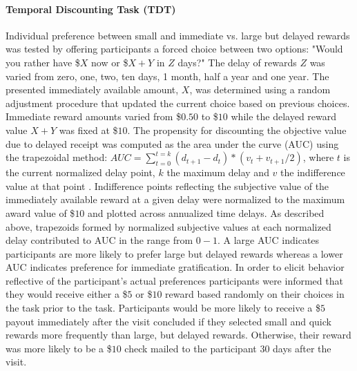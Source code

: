 \documentclass[utf8]{frontiersSCNS} %
\begin{document}
\paragraph{Temporal Discounting Task (TDT)} Individual preference between small and immediate vs. large but delayed rewards was tested by offering participants a forced choice between two options: "Would you rather have \$$X$ now or \$$X+Y$ in $Z$ days?" The delay of rewards $Z$ was varied from zero, one, two, ten days, 1 month, half a year and one year. The presented immediately available amount, $X$, was determined using a random adjustment procedure that updated the current choice based on previous choices. Immediate reward amounts varied from \$$0.50$ to \$$10$ while the delayed reward value $X+Y$ was fixed at \$$10$. The propensity for discounting the objective value due to delayed receipt was computed as the area under the curve (AUC) using the trapezoidal method: $AUC = \sum_{t=0}^{t=k} (d_{t+1}-d_t)*(v_t+v_{t+1} /2)$, where $t$ is the current normalized delay point, $k$ the maximum delay and $v$ the indifference value at that point \citep{Borges2016,olson2007adolescents, myerson2001area}. Indifference points reflecting the subjective value of the immediately available reward at a given delay were normalized to the maximum award value of \$$10$ and plotted across annualized time delays. As described above, trapezoids formed by normalized subjective values at each normalized delay contributed to AUC in the range from $0-1$.  A large AUC indicates participants are more likely to prefer large but delayed rewards whereas a lower AUC indicates preference for immediate gratification. In order to elicit behavior reflective of the participant's actual preferences participants were informed that they would receive either a \$$5$ or \$$10$ reward based randomly on their choices in the task prior to the task. Participants would be more likely to receive a \$$5$ payout immediately after the visit concluded if they selected small and quick rewards more frequently than large, but delayed rewards. Otherwise, their reward was more likely to be a \$$10$ check mailed to the participant 30 days after the visit. 
\vspace{2pt}
\end{document}

